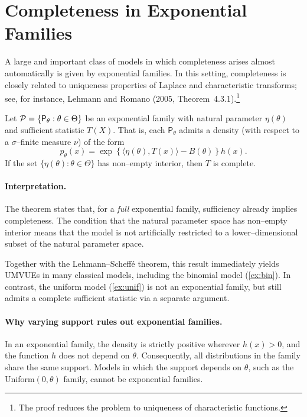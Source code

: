 \section{Completeness in Exponential Families}%
\label{sec:cef}

A large and important class of models in which completeness arises almost automatically is given by exponential families.  
In this setting, completeness is closely related to uniqueness properties of Laplace and characteristic transforms; see, for instance, Lehmann and Romano (2005, Theorem~4.3.1).\footnote{The proof reduces the problem to uniqueness of characteristic functions.}

\begin{theo}[]
\label{theo:cef}
Let \(\mathcal{P}=\{\mathsf{P}_{\theta} : \theta\in\Theta\}\) be an exponential family with natural parameter \(\eta(\theta)\) and sufficient statistic \(T(X)\).  
That is, each \(\mathsf{P}_{\theta}\) admits a density (with respect to a \(\sigma\)--finite measure \(\nu\)) of the form
\[
p_{\theta}(x)
= \exp\!\left\{ \langle \eta(\theta), T(x) \rangle - B(\theta) \right\} h(x).
\]
If the set \(\{\eta(\theta) : \theta\in\Theta\}\) has non--empty interior, then \(T\) is complete.
\end{theo}

\paragraph{Interpretation.}
The theorem states that, for a \emph{full} exponential family, sufficiency already implies completeness.  
The condition that the natural parameter space has non--empty interior means that the model is not artificially restricted to a lower--dimensional subset of the natural parameter space.

Together with the Lehmann--Scheff\'e theorem, this result immediately yields UMVUEs in many classical models, including the binomial model (\autoref{ex:bin}).  
In contrast, the uniform model (\autoref{ex:unif}) is not an exponential family, but still admits a complete sufficient statistic via a separate argument.

\paragraph{Why varying support rules out exponential families.}
In an exponential family, the density is strictly positive wherever \(h(x)>0\), and the function \(h\) does not depend on \(\theta\).
Consequently, all distributions in the family share the same support.
Models in which the support depends on \(\theta\), such as the Uniform\((0,\theta)\) family, cannot be exponential families.

